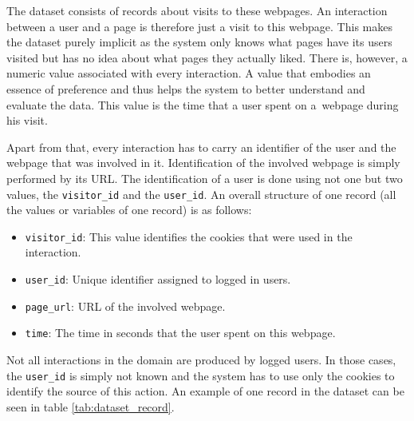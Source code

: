 The dataset consists of records about visits to these webpages. An interaction between a user and a page is therefore just a visit to this webpage. This makes the dataset purely implicit as the system only knows what pages have its users visited but has no idea about what pages they actually liked. There is, however, a numeric value associated with every interaction. A value that embodies an essence of preference and thus helps the system to better understand and evaluate the data. This value is the time that a user spent on a~webpage during his visit. 

Apart from that, every interaction has to carry an identifier of the user and the webpage that was involved in it. Identification of the involved webpage is simply performed by its URL. The identification of a user is done using not one but two values, the \texttt{visitor\_id} and the \texttt{user\_id}. An overall structure of one record (all the values or variables of one record) is as follows:

\begin{itemize}
    \item \texttt{visitor\_id}: This value identifies the cookies that were used in the interaction.
    \item \texttt{user\_id}: Unique identifier assigned to logged in users.
    \item \texttt{page\_url}: URL of the involved webpage.
    \item \texttt{time}: The time in seconds that the user spent on this webpage.
\end{itemize}
Not all interactions in the domain are produced by logged users. In those cases, the \texttt{user\_id} is simply not known and the system has to use only the cookies to identify the source of this action. An example of one record in the dataset can be seen in table \ref{tab:dataset_record}. \\ \\

